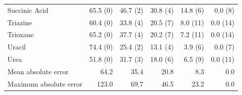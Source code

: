 \begin{table}[h]
\begin{tabular}{lrrrrr}
Succinic Acid & 65.5 (0) & 46.7 (2) & 30.8 (4) & 14.8 (6) & 0.0 (8) \\
Triazine & 60.4 (0) & 33.8 (4) & 20.5 (7) & 8.0 (11) & 0.0 (14) \\
Trioxane & 65.2 (0) & 37.7 (4) & 20.2 (7) & 7.2 (11) & 0.0 (14) \\
Uracil & 74.4 (0) & 25.4 (2) & 13.1 (4) & 3.9 (6) & 0.0 (7) \\
Urea & 51.8 (0) & 31.7 (3) & 18.0 (6) & 6.5 (9) & 0.0 (11) \\
Mean absolute error & 64.2 & 35.4 & 20.8 & 8.3 & 0.0 \\
Maximum absolute error & 123.0 & 69.7 & 46.5 & 23.2 & 0.0 \\
\bottomrule
\end{tabular}

\end{table}